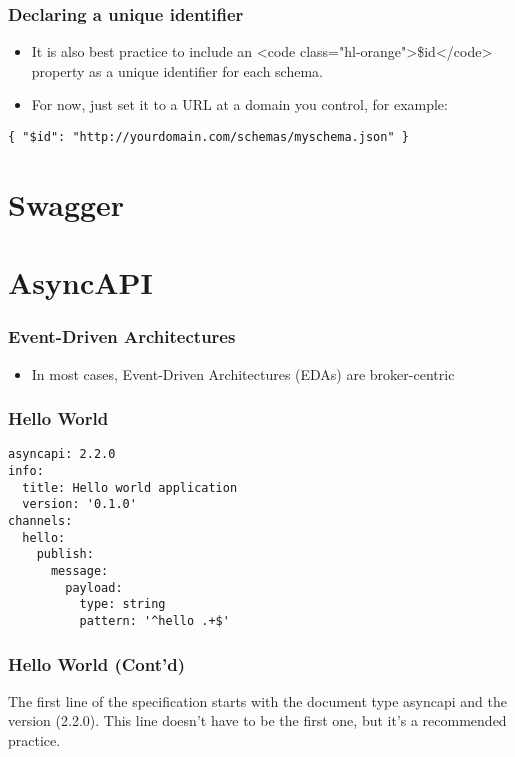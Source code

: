 \documentclass{efd-lecture}
\begin{document}
\begin{frame}[fragile]
  \frametitle{Declaring a unique identifier}
  \begin{itemize}
    \item It is also best practice to include an
      <code class="hl-orange">\$id</code> property as a unique identifier for
      each schema.
    \item For now, just set it to a URL at a domain you control, for example:
  \end{itemize}
  \begin{verbatim}
{ "$id": "http://yourdomain.com/schemas/myschema.json" }
  \end{verbatim}
\end{frame}

\section{Swagger}

\section{AsyncAPI}

\begin{frame}
  \frametitle{Event-Driven Architectures}
  \begin{itemize}
    \item In most cases, Event-Driven Architectures (EDAs) are broker-centric
  \end{itemize}
\end{frame}

\begin{frame}[fragile]
  \frametitle{Hello World}
  \begin{verbatim}
asyncapi: 2.2.0
info:
  title: Hello world application
  version: '0.1.0'
channels:
  hello:
    publish:
      message:
        payload:
          type: string
          pattern: '^hello .+$'
  \end{verbatim}
\end{frame}

\begin{frame}[fragile]
  \frametitle{Hello World (Cont'd)}
  \begin{block}{}
    The first line of the specification starts with the document type asyncapi and the version (2.2.0).
    This line doesn't have to be the first one,
    but it's a recommended practice.
  \end{block}
\end{frame}
\end{document}
